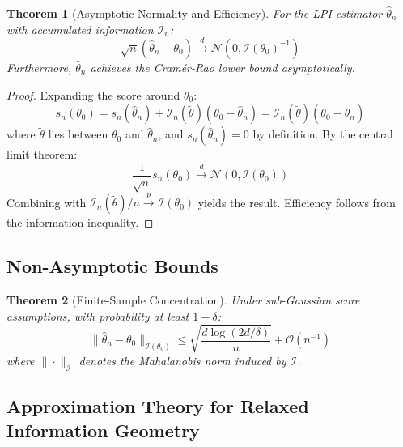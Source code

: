 \documentclass[11pt]{article}
\newtheorem{theorem}{Theorem}
\begin{document}
\begin{theorem}[Asymptotic Normality and Efficiency]
\label{thm:asymptotic_normality}
For the LPI estimator $\hat{\theta}_n$ with accumulated information $\mathcal{I}_n$:
\begin{equation}
\sqrt{n}(\hat{\theta}_n - \theta_0) \xrightarrow{d} \mathcal{N}(0, \mathcal{I}(\theta_0)^{-1})
\end{equation}
Furthermore, $\hat{\theta}_n$ achieves the Cramér-Rao lower bound asymptotically.
\end{theorem}

\begin{proof}
Expanding the score around $\theta_0$:
\begin{equation}
s_n(\theta_0) = s_n(\hat{\theta}_n) + \mathcal{I}_n(\tilde{\theta})(\theta_0 - \hat{\theta}_n) = \mathcal{I}_n(\tilde{\theta})(\theta_0 - \hat{\theta}_n)
\end{equation}
where $\tilde{\theta}$ lies between $\theta_0$ and $\hat{\theta}_n$, and $s_n(\hat{\theta}_n) = 0$ by definition. By the central limit theorem:
\begin{equation}
\frac{1}{\sqrt{n}}s_n(\theta_0) \xrightarrow{d} \mathcal{N}(0, \mathcal{I}(\theta_0))
\end{equation}
Combining with $\mathcal{I}_n(\tilde{\theta})/n \xrightarrow{p} \mathcal{I}(\theta_0)$ yields the result. Efficiency follows from the information inequality.
\end{proof}

\subsection{Non-Asymptotic Bounds}

\begin{theorem}[Finite-Sample Concentration]
\label{thm:concentration}
Under sub-Gaussian score assumptions, with probability at least $1-\delta$:
\begin{equation}
\|\hat{\theta}_n - \theta_0\|_{\mathcal{I}(\theta_0)} \leq \sqrt{\frac{d \log(2d/\delta)}{n}} + \mathcal{O}(n^{-1})
\end{equation}
where $\|\cdot\|_{\mathcal{I}}$ denotes the Mahalanobis norm induced by $\mathcal{I}$.
\end{theorem}

\subsection{Approximation Theory for Relaxed Information Geometry}
\end{document}
